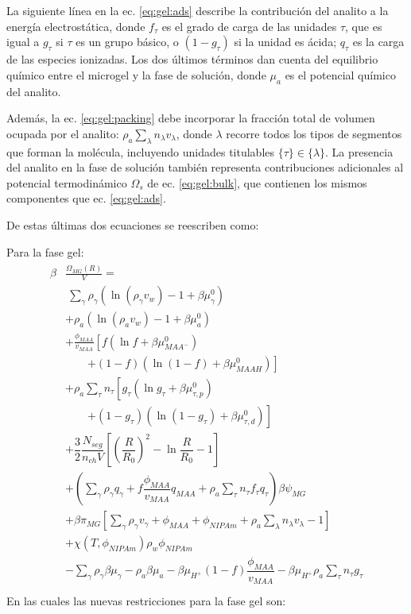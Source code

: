 La siguiente l\'inea en la ec. \ref{eq:gel:ads} describe la contribuci\'on del analito a la energ\'ia electrost\'atica, donde $f_\tau$ es el grado de carga de las unidades $\tau$, que es igual a $g_\tau$ si $\tau$ es un grupo b\'asico, o $(1-g_\tau)$ si la unidad es \'acida; $q_\tau$ es la carga de las especies ionizadas.
Los dos \'ultimos t\'erminos dan cuenta del equilibrio qu\'imico entre el microgel y la fase de soluci\'on, donde $\mu_a$ es el potencial qu\'imico del analito.

Adem\'as, la ec. \ref{eq:gel:packing} debe incorporar la fracci\'on total de volumen ocupada por el analito: $\rho_a \sum_\lambda n_\lambda v_\lambda$, donde $\lambda$ recorre todos los tipos de segmentos que forman la mol\'ecula, incluyendo unidades titulables $\{\tau\}\in\{\lambda\}$.
La presencia del analito en la fase de soluci\'on tambi\'en representa contribuciones adicionales al potencial termodin\'amico $\Omega_s$ de ec. \ref{eq:gel:bulk}, que contienen los mismos componentes que ec. \ref{eq:gel:ads}.

De estas \'ultimas dos ecuaciones se reescriben como:

Para la fase gel:
\begin{align}
	\begin{aligned}
		\beta&\frac{\Omega_{MG}(R)}{V}=\\
		& ~ \sum_{\gamma} \rho_\gamma\left(\ln\left(\rho_\gamma v_w\right) -1 + \beta\mu^0_\gamma\right) \\
		&+ \rho_a\left(\ln\left(\rho_a v_w\right) -1 + \beta\mu^0_a\right) \\
		& + \frac{\phi_{MAA}}{v_{MAA}} \left[f(\ln f+ \beta\mu^0_{MAA^-})\right.\\
		&\qquad\left.+(1-f)(\ln (1-f)+\beta\mu^0_{MAAH})\right] \\
		& + \rho_a \sum_\tau n_\tau  \left[g_\tau(\ln g_\tau+ \beta\mu^0_{\tau,p})\right.\\
		&\qquad\left.+(1-g_\tau)(\ln (1-g_\tau)+\beta\mu^0_{\tau,d})\right] \\
		& + \dfrac{3}{2}\dfrac{N_{seg}}{n_{ch} V}\left[\left(\dfrac{R}{R_0}\right)^2 - \ln\dfrac{R}{R_0} -1\right] \\
		& +  \left(\sum_{\gamma } {\rho_\gamma q_\gamma + f\dfrac{\phi_{MAA}}{v_{MAA}}q_{MAA}} + \rho_a \sum_\tau n_\tau f_\tau q_\tau \right)\beta\psi_{MG}\\
		& +\beta\pi_{MG} \left[ \sum_{\gamma } \rho_\gamma v_\gamma  + \phi_{MAA} + \phi_{NIPAm} + \rho_a \sum_\lambda n_\lambda v_\lambda -1 \right] \\
		& + \chi (T, \phi_{NIPAm})\rho_w \phi_{NIPAm} \\
		& -\sum_{\gamma }{\rho_\gamma\beta\mu_\gamma} -\rho_a\beta\mu_a
		-\beta\mu_{H^+}(1-f)\dfrac{\phi_{MAA}}{v_{MAA}} 
		-\beta\mu_{H^+} \rho_a \sum_\tau n_\tau g_\tau\\
	\end{aligned}
	\label{eq:gel:total}
\end{align}
En las cuales las nuevas restricciones para la fase gel son:

